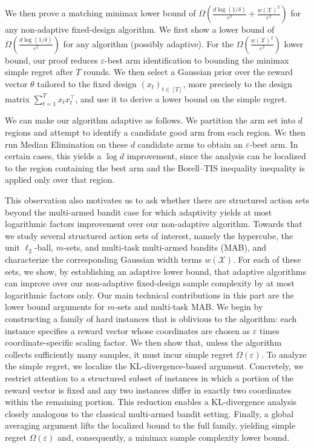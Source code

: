 We then prove a matching minimax lower bound of $\Omega\!\left(\frac{d\log(1/\delta)}{\varepsilon^2}+\frac{w(\mathcal{X})^2}{\varepsilon^2}\right)$ for any non-adaptive fixed-design algorithm. We first show a lower bound of $\Omega\!\left(\frac{d\log(1/\delta)}{\varepsilon^2}\right)$ for any algorithm (possibly adaptive). For the $\Omega\!\left(\frac{w(\mathcal{X})^2}{\varepsilon^2}\right)$ lower bound, our proof reduces $\varepsilon$-best arm identification to bounding the minimax simple regret after $T$ rounds. We then select a Gaussian prior over the reward vector $\theta$ tailored to the fixed design $(x_t)_{t\in[T]}$, more precisely to the design matrix $\sum_{t=1}^T x_t x_t^\top$, and use it to derive a lower bound on the simple regret. 

We can make our algorithm adaptive as follows. We partition the arm set into $d$ regions and attempt to identify a candidate good arm from each region. We then run Median Elimination on these $d$ candidate arms to obtain an $\varepsilon$-best arm. In certain cases, this yields a $\log d$ improvement, since the analysis can be localized to the region containing the best arm and the Borell--TIS inequality inequality is applied only over that region.

This observation also motivates us to ask whether there are structured action sets beyond the multi-armed bandit case for which adaptivity yields at most logarithmic factors improvement over our non-adaptive algorithm. Towards that we study several structured action sets of interest, namely the hypercube, the unit $\ell_2$-ball, $m$-sets, and multi-task multi-armed bandits (MAB), and characterize the corresponding Gaussian width terms $w(\mathcal{X})$. For each of these sets, we show, by establishing an adaptive lower bound, that adaptive algorithms can improve over our non-adaptive fixed-design sample complexity by at most logarithmic factors only. Our main technical contributions in this part are the lower bound arguments for $m$-sets and multi-task MAB. We begin by constructing a family of hard instances that is oblivious to the algorithm: each instance specifies a reward vector whose coordinates are chosen as $\varepsilon$ times coordinate-specific scaling factor. We then show that, unless the algorithm collects sufficiently many samples, it must incur simple regret $\Omega(\varepsilon)$. To analyze the simple regret, we localize the KL-divergence-based argument. Concretely, we restrict attention to a structured subset of instances in which a portion of the reward vector is fixed and any two instances differ in exactly two coordinates within the remaining portion. This reduction enables a KL-divergence analysis closely analogous to the classical multi-armed bandit setting. Finally, a global averaging argument lifts the localized bound to the full family, yielding simple regret $\Omega(\varepsilon)$ and, consequently, a minimax sample complexity lower bound.

